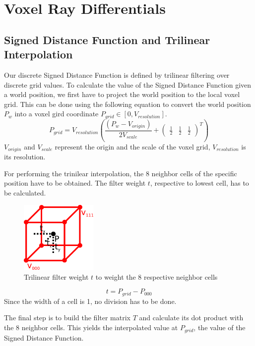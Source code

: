\section{Voxel Ray Differentials}

\subsection{Signed Distance Function and Trilinear Interpolation}
Our discrete Signed Distance Function is defined by trilinear filtering over discrete grid values. To calculate the value of the Signed Distance Function given a world position, we first have to project the world position to the local voxel grid. This can be done using the following equation to convert the world position $P_{w}$ into a voxel gird coordinate $P_{grid} \in [0, V_{resolution}]$.
\begin{equation}
P_{grid} = V_{resolution} \left(\frac{\left(P_{w} - V_{origin}\right)}{2V_{scale}}  + \begin{pmatrix}\frac{1}{2} & \frac{1}{2} & \frac{1}{2}\end{pmatrix}^T \right) 
\end{equation}
$V_{origin}$ and $V_{scale}$ represent the origin and the scale of the voxel grid, $V_{resolution}$ is its resolution.

For performing the trinilear interpolation, the 8 neighbor cells of the specific position have to be obtained. The filter weight $t$, respective to lowest cell, has to be calculated.

\begin{figure}[H]
	\caption{Trilinear filter weight $t$ to weight the 8 respective neighbor cells}
	\centering
	\includegraphics[width=10em]{images/trilinear_filter_weight}
\end{figure}
\begin{equation}
t = P_{grid} - P_{000}
\end{equation}
Since the width of a cell is 1, no division has to be done.

The final step is to build the filter matrix $T$ and calculate its dot product with the 8 neighbor cells. This yields the interpolated value at $P_{grid}$, the value of the Signed Distance Function.

